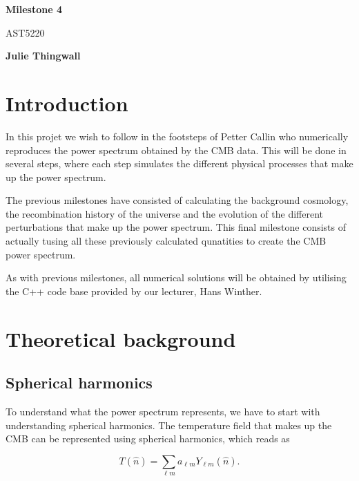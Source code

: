 \documentclass[12pt]{article}
\begin{document}
    \begin{titlepage}
        \begin{center}
            \vspace*{5cm}
            
            \Huge
            \textbf{Milestone 4}
            
            \vspace*{0.5cm}
            \LARGE
            AST5220
        
            \vspace*{0.5cm}
        
            \textbf{Julie Thingwall}
        \end{center}
    \end{titlepage}

\section{Introduction}
In this projet we wish to follow in the footsteps of Petter Callin\cite{callin2006calculate} who numerically reproduces the power spectrum obtained by the CMB data. This will be done in several steps, where each step simulates the different physical processes that make up the power spectrum.

The previous milestones have consisted of calculating the background cosmology, the recombination history of the universe and the evolution of the different perturbations that make up the power spectrum. This final milestone consists of actually tusing all these previously calculated qunatities to create the CMB power spectrum. 

As with previous milestones, all numerical solutions will be obtained by utilising the C++ code base provided by our lecturer, Hans Winther.

\section{Theoretical background}
\subsection{Spherical harmonics}
To understand what the power spectrum represents, we have to start with understanding spherical harmonics. The temperature field that makes up the CMB can be represented using spherical harmonics, which reads as 

\begin{equation}
    T(\hat{n})=\sum_{\ell m} a_{\ell m} Y_{\ell m}(\hat{n}).
\end{equation}
\end{document}
